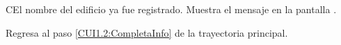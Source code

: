 \begin{UCtrayectoriaA}{C}{El nombre del edificio ya fue registrado.}
	\UCpaso [\UCsist] Muestra el mensaje  en la pantalla .
	
	\UCpaso Regresa al paso \ref{CUI1.2:CompletaInfo} de la trayectoria principal.
\end{UCtrayectoriaA}


